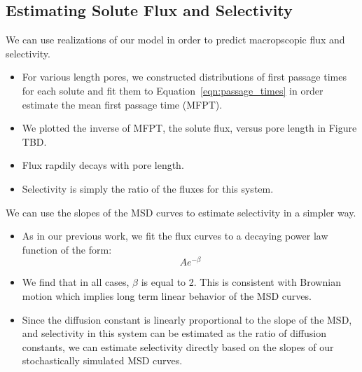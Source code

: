 \documentclass{article}
\begin{document}
  
  \subsection{Estimating Solute Flux and Selectivity}  
  
  
  We can use realizations of our model in order to predict macropscopic flux and
  selectivity.
  \begin{itemize}
    \item For various length pores, we constructed distributions of first passage times for each solute and
    fit them to Equation~\ref{eqn:passage_times} in order estimate the mean 
    first passage time (MFPT). 
    \item We plotted the inverse of MFPT, the solute flux, versus pore length
    in Figure TBD.
    \item Flux rapdily decays with pore length.
    \item Selectivity is simply the ratio of the fluxes for this system.
  \end{itemize}

  We can use the slopes of the MSD curves to estimate selectivity in a simpler way.
  \begin{itemize}
  	\item As in our previous work, we fit the flux curves to a decaying power law function
  	of the form:
  	\begin{equation}
    	Ae^{-\beta}
  	\end{equation}
  	\item We find that in all cases, $\beta$ is equal to 2. This is consistent with Brownian
	motion which implies long term linear behavior of the MSD curves. 
	\item Since the diffusion constant is linearly proportional to the slope of the MSD, and 
	selectivity in this system can be estimated as the ratio of diffusion constants, we can 
	estimate selectivity directly based on the slopes of our stochastically simulated MSD curves.
  \end{itemize}
  
\end{document}
